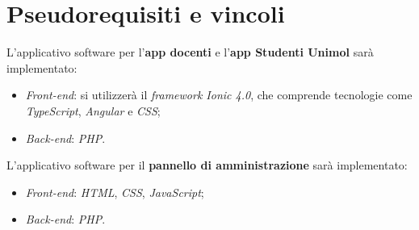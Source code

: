 \section{Pseudorequisiti e vincoli}
L’applicativo software per l’\textbf{app docenti} e l’\textbf{app Studenti Unimol} sarà implementato:
\begin{itemize}
\item  \emph{Front-end}: si utilizzerà il \emph{framework Ionic 4.0}, che comprende tecnologie come \emph{TypeScript}, \emph{Angular} e \emph{CSS};
\item \emph{Back-end}: \emph{PHP}.
\end{itemize}
L’applicativo software per il \textbf{pannello di amministrazione} sarà implementato: 
\begin{itemize}
\item \emph{Front-end}: \emph{HTML}, \emph{CSS}, \emph{JavaScript};
\item \emph{Back-end}: \emph{PHP}.
\end{itemize}
\clearpage